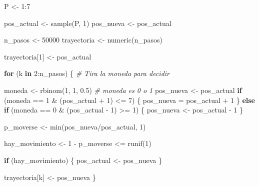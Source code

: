 \documentclass[
  12pt,
]{book}
\newenvironment{Shaded}{\begin{snugshade}}{\end{snugshade}}
\newcommand{\CommentTok}[1]{\textcolor[rgb]{0.56,0.35,0.01}{\textit{#1}}}
\newcommand{\ControlFlowTok}[1]{\textcolor[rgb]{0.13,0.29,0.53}{\textbf{#1}}}
\newcommand{\DecValTok}[1]{\textcolor[rgb]{0.00,0.00,0.81}{#1}}
\newcommand{\FloatTok}[1]{\textcolor[rgb]{0.00,0.00,0.81}{#1}}
\newcommand{\FunctionTok}[1]{\textcolor[rgb]{0.00,0.00,0.00}{#1}}
\newcommand{\NormalTok}[1]{#1}
\newcommand{\OtherTok}[1]{\textcolor[rgb]{0.56,0.35,0.01}{#1}}
\newcommand{\SpecialCharTok}[1]{\textcolor[rgb]{0.00,0.00,0.00}{#1}}
\theoremstyle{definition}
\theoremstyle{definition}
\theoremstyle{definition}
\theoremstyle{remark}
\begin{document}
\begin{Shaded}
\begin{Highlighting}[]
\NormalTok{P }\OtherTok{\textless{}{-}} \DecValTok{1}\SpecialCharTok{:}\DecValTok{7}

\NormalTok{pos\_actual }\OtherTok{\textless{}{-}} \FunctionTok{sample}\NormalTok{(P, }\DecValTok{1}\NormalTok{)}
\NormalTok{pos\_nueva }\OtherTok{\textless{}{-}}\NormalTok{ pos\_actual}

\NormalTok{n\_pasos }\OtherTok{\textless{}{-}} \DecValTok{50000}
\NormalTok{trayectoria }\OtherTok{\textless{}{-}} \FunctionTok{numeric}\NormalTok{(n\_pasos)}

\NormalTok{trayectoria[}\DecValTok{1}\NormalTok{] }\OtherTok{\textless{}{-}}\NormalTok{ pos\_actual}

\ControlFlowTok{for}\NormalTok{ (k }\ControlFlowTok{in} \DecValTok{2}\SpecialCharTok{:}\NormalTok{n\_pasos) \{}
    \CommentTok{\# Tira la moneda para decidir}
    
\NormalTok{    moneda }\OtherTok{\textless{}{-}} \FunctionTok{rbinom}\NormalTok{(}\DecValTok{1}\NormalTok{, }\DecValTok{1}\NormalTok{, }\FloatTok{0.5}\NormalTok{)}
    \CommentTok{\# moneda es 0 o 1}
\NormalTok{    pos\_nueva }\OtherTok{\textless{}{-}}\NormalTok{ pos\_actual}
    \ControlFlowTok{if}\NormalTok{ (moneda }\SpecialCharTok{==} \DecValTok{1} \SpecialCharTok{\&}\NormalTok{ (pos\_actual }\SpecialCharTok{+} \DecValTok{1}\NormalTok{) }\SpecialCharTok{\textless{}=} \DecValTok{7}\NormalTok{) \{}
\NormalTok{        pos\_nueva }\OtherTok{=}\NormalTok{ pos\_actual }\SpecialCharTok{+} \DecValTok{1}
\NormalTok{    \} }\ControlFlowTok{else} \ControlFlowTok{if}\NormalTok{ (moneda }\SpecialCharTok{==} \DecValTok{0} \SpecialCharTok{\&}\NormalTok{ (pos\_actual }\SpecialCharTok{{-}} \DecValTok{1}\NormalTok{) }\SpecialCharTok{\textgreater{}=} \DecValTok{1}\NormalTok{) \{}
\NormalTok{        pos\_nueva }\OtherTok{\textless{}{-}}\NormalTok{ pos\_actual }\SpecialCharTok{{-}} \DecValTok{1}
\NormalTok{    \}}
    
\NormalTok{    p\_moverse }\OtherTok{\textless{}{-}} \FunctionTok{min}\NormalTok{(pos\_nueva}\SpecialCharTok{/}\NormalTok{pos\_actual, }\DecValTok{1}\NormalTok{)}
    
\NormalTok{    hay\_movimiento }\OtherTok{\textless{}{-}} \DecValTok{1} \SpecialCharTok{{-}}\NormalTok{ p\_moverse }\SpecialCharTok{\textless{}=} \FunctionTok{runif}\NormalTok{(}\DecValTok{1}\NormalTok{)}
    
    \ControlFlowTok{if}\NormalTok{ (hay\_movimiento) \{}
\NormalTok{        pos\_actual }\OtherTok{\textless{}{-}}\NormalTok{ pos\_nueva}
\NormalTok{    \}}
    
\NormalTok{    trayectoria[k] }\OtherTok{\textless{}{-}}\NormalTok{ pos\_nueva}
\NormalTok{\}}
\end{Highlighting}
\end{Shaded}
\end{document}
